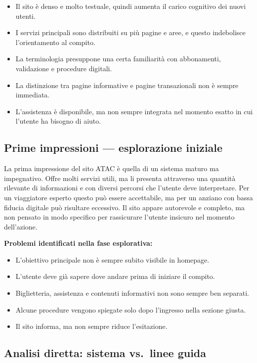 \documentclass[11pt,a4paper]{article}
\begin{document}
\begin{itemize}
    \item Il sito è denso e molto testuale, quindi aumenta il carico cognitivo dei nuovi utenti.
    \item I servizi principali sono distribuiti su più pagine e aree, e questo indebolisce l’orientamento al compito.
    \item La terminologia presuppone una certa familiarità con abbonamenti, validazione e procedure digitali.
    \item La distinzione tra pagine informative e pagine transazionali non è sempre immediata.
    \item L’assistenza è disponibile, ma non sempre integrata nel momento esatto in cui l’utente ha bisogno di aiuto.
\end{itemize}

\subsection*{Prime impressioni — esplorazione iniziale}

\noindent La prima impressione del sito ATAC è quella di un sistema maturo ma impegnativo. Offre molti servizi utili, ma li presenta attraverso una quantità rilevante di informazioni e con diversi percorsi che l’utente deve interpretare. Per un viaggiatore esperto questo può essere accettabile, ma per un anziano con bassa fiducia digitale può risultare eccessivo. Il sito appare autorevole e completo, ma non pensato in modo specifico per rassicurare l’utente insicuro nel momento dell’azione.

\noindent\textbf{Problemi identificati nella fase esplorativa:}

\begin{itemize}
    \item L’obiettivo principale non è sempre subito visibile in homepage.
    \item L’utente deve già sapere dove andare prima di iniziare il compito.
    \item Biglietteria, assistenza e contenuti informativi non sono sempre ben separati.
    \item Alcune procedure vengono spiegate solo dopo l’ingresso nella sezione giusta.
    \item Il sito informa, ma non sempre riduce l’esitazione.
\end{itemize}

\subsection*{Analisi diretta: sistema vs.\ linee guida}
\end{document}
